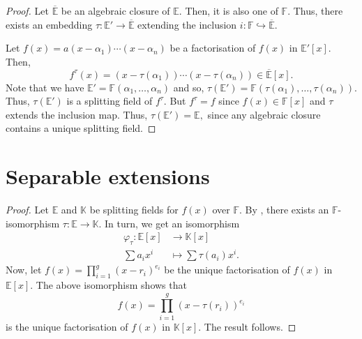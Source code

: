\isosplitting*\label{thm:isosplitting2}
\begin{flushright}\hyperref[thm:isosplitting]{\upsym}\end{flushright}
\begin{proof}
    Let $\overline{\mathbb{E}}$ be an algebraic closure of $\mathbb{E}.$ Then, it is also one of $\mathbb{F}.$ Thus, there exists an embedding $\tau : \mathbb{E}' \to \overline{\mathbb{E}}$ extending the inclusion $i : \mathbb{F} \hookrightarrow \overline{\mathbb{E}}.$

    Let $f(x) = a(x - \alpha_1) \cdots (x - \alpha_n)$ be a factorisation of $f(x)$ in $\mathbb{E}'[x].$ Then,
    \begin{equation*} 
        f^{\tau}(x) = (x - \tau(\alpha_1)) \cdots (x - \tau(\alpha_n)) \in \overline{\mathbb{E}}[x].
    \end{equation*}
    Note that we have $\mathbb{E}' = \mathbb{F}(\alpha_1, \ldots, \alpha_n)$ and so, $\tau(\mathbb{E}') = \mathbb{F}(\tau(\alpha_1), \ldots, \tau(\alpha_n)).$ Thus, $\tau(\mathbb{E}')$ is a splitting field of $f^{\tau}.$ But $f^{\tau} = f$ since $f(x) \in \mathbb{F}[x]$ and $\tau$ extends the inclusion map. Thus, $\tau(\mathbb{E}') = \mathbb{E},$ since any algebraic closure contains a unique splitting field.
\end{proof}

\section{Separable extensions}
\multindepsplitting*\label{prop:multindepsplitting2}
\begin{flushright}\hyperref[prop:multindepsplitting]{\upsym}\end{flushright}
\begin{proof}
    Let $\mathbb{E}$ and $\mathbb{K}$ be splitting fields for $f(x)$ over $\mathbb{F}.$ By , there exists an $\mathbb{F}$-isomorphism $\tau : \mathbb{E} \to \mathbb{K}.$ In turn, we get an isomorphism
    \begin{align*} 
        \varphi_\tau : \mathbb{E}[x] &\to \mathbb{K}[x]\\
        \sum a_i x^i &\mapsto \sum \tau(a_i) x^i.
    \end{align*}
    Now, let $f(x) = \prod_{i = 1}^{g}(x - r_i)^{e_i}$ be the unique factorisation of $f(x)$ in $\mathbb{E}[x].$ The above isomorphism shows that 
    \begin{equation*} 
        f(x)= \prod_{i = 1}^{g}(x - \tau(r_i))^{e_i}
    \end{equation*}
    is the unique factorisation of $f(x)$ in $\mathbb{K}[x].$ The result follows.
\end{proof}

